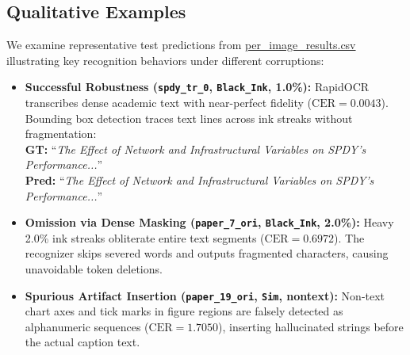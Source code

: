 \subsection{Qualitative Examples}
We examine representative test predictions from \url{per_image_results.csv} illustrating key recognition behaviors under different corruptions:
\begin{itemize}[leftmargin=*,itemsep=2pt]
    \item \textbf{Successful Robustness (\texttt{spdy\_tr\_0}, \texttt{Black\_Ink}, 1.0\%):} RapidOCR transcribes dense academic text with near-perfect fidelity ($\text{CER}=0.0043$). Bounding box detection traces text lines across ink streaks without fragmentation: \\
    \hspace*{1em}\textbf{GT:} ``\textit{The Effect of Network and Infrastructural Variables on SPDY's Performance...}'' \\
    \hspace*{1em}\textbf{Pred:} ``\textit{The Effect of Network and Infrastructural Variables on SPDY's Performance...}''

    \item \textbf{Omission via Dense Masking (\texttt{paper\_7\_ori}, \texttt{Black\_Ink}, 2.0\%):} Heavy 2.0\% ink streaks obliterate entire text segments ($\text{CER}=0.6972$). The recognizer skips severed words and outputs fragmented characters, causing unavoidable token deletions.

    \item \textbf{Spurious Artifact Insertion (\texttt{paper\_19\_ori}, \texttt{Sim}, nontext):} Non-text chart axes and tick marks in figure regions are falsely detected as alphanumeric sequences ($\text{CER}=1.7050$), inserting hallucinated strings before the actual caption text.
\end{itemize}

